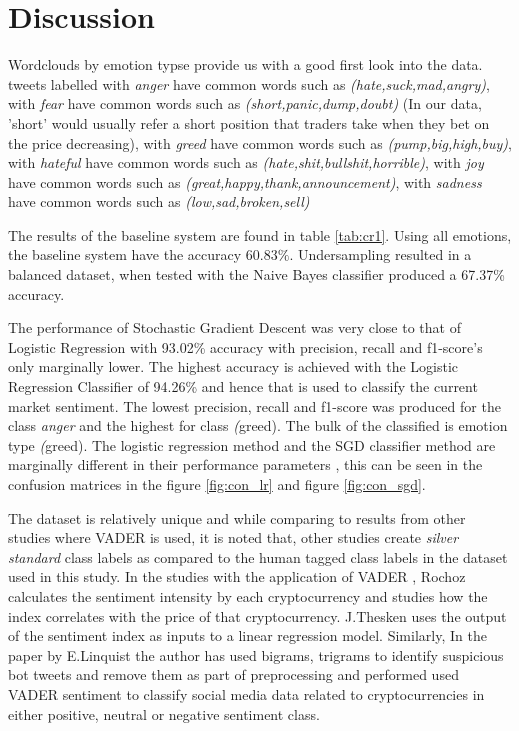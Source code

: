 \documentclass[a4paper, 12pt]{article}
\begin{document}
\pagebreak
\section{Discussion}

Wordclouds by emotion typse provide us with a good first look into the data. tweets labelled with \textit{anger} have common words such as \textit{(hate,suck,mad,angry)},
with \textit{fear} have common words such as \textit{(short,panic,dump,doubt)} (In our data, 'short' would usually refer a short position that traders take when they bet on the price decreasing),
with \textit{greed} have common words such as \textit{(pump,big,high,buy)},
with \textit{hateful} have common words such as \textit{(hate,shit,bullshit,horrible)},
with \textit{joy} have common words such as \textit{(great,happy,thank,announcement)},
with \textit{sadness} have common words such as \textit{(low,sad,broken,sell)} 

The results of the baseline system are found in table \ref{tab:cr1}.
Using all emotions, the baseline system have the accuracy $60.83\%$. Undersampling resulted in a balanced dataset, when tested with the Naive Bayes classifier produced a 67.37\% accuracy.

The performance of Stochastic Gradient Descent was very close to that of Logistic Regression with 93.02\% accuracy with precision, recall and f1-score's only marginally lower.
The highest accuracy is achieved with the Logistic Regression Classifier of 94.26\% and hence that is used to classify the current market sentiment.
The lowest precision, recall and f1-score was produced for the class \textit{anger} and the highest for class \textit(greed). The bulk of the classified is emotion type \textit(greed).
The logistic regression method and the SGD classifier method are marginally different in their performance parameters , this can be seen in the confusion matrices in the figure \ref{fig:con_lr} and figure \ref{fig:con_sgd}.

The dataset is relatively unique and while comparing to results from other studies where VADER is used, it is noted that, other studies create \textit{silver standard} class labels as compared to the human tagged class labels in the dataset used in this study.
In the studies with the application of VADER , \cite{rochoz_cryptosentiment} Rochoz calculates the sentiment intensity by each cryptocurrency and studies how the index correlates with the price of that cryptocurrency. \cite{Thesken_altmonitor} J.Thesken uses the output of the sentiment index as inputs to a linear regression model. Similarly, In the paper by E.Linquist  \cite{kthbtcsentiment} the author has used bigrams, trigrams to identify suspicious bot tweets and remove them as part of preprocessing and performed used VADER sentiment to classify social media data related to cryptocurrencies in either positive, neutral or negative sentiment class.
\end{document}
